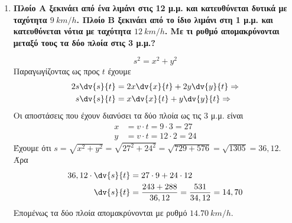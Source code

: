 \begin{enumerate}
  \item {\bfseries \boldmath Πλοίο Α ξεκινάει από ένα λιμάνι στις 12 μ.μ. και 
      κατευθύνεται δυτικά
      με ταχύτητα  $\SI{9}{km/h}$. Πλοίο Β ξεκινάει από το ίδιο λιμάνι στη 1
      μ.μ. και κατευθύνεται νότια με ταχύτητα $\SI{12}{km/h}$. Με τι ρυθμό
    απομακρύνονται μεταξύ τους τα δύο πλοία στις 3 μ.μ.?}
    \begin{solution}
      \[
        s^{2} = x^{2} + y^{2}
      \]
      Παραγωγίζοντας ως προς $t$ έχουμε
      \begin{align*}
        2s \dv{s}{t} & = 2x\dv{x}{t} + 2y\dv{y}{t} \Rightarrow \\
        s \dv{s}{t} & = x\dv{x}{t} + y\dv{y}{t} \Rightarrow \\
      \end{align*}
      Οι αποστάσεις που έχουν διανύσει τα δύο πλοία ως τις $3$ μ.μ. είναι
      \begin{align*}
        x &= v\cdot t = 9 \cdot 3 = 27 \\
        y &= v\cdot t = 12 \cdot 2 = 24
      \end{align*}
      Έχουμε ότι $ s = \sqrt{x^{2} + y^{2}} = \sqrt{27^{2} + 24^{2}} =
      \sqrt{729 + 576} = \sqrt{1305} = 36,12$.
      Άρα 
      \begin{align}
        36,12 \cdot \dv{s}{t} &= 27\cdot 9 + 24 \cdot 12 \\
        \dv{s}{t} &= \frac{243 + 288}{36,12} = \frac{531}{34,12} = 14,70
      \end{align}
      Επομένως τα δύο πλοία απομακρύνονται με ρυθμό $\SI{14,70}{km/h}$.
    \end{solution}
\end{enumerate}





